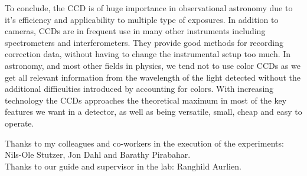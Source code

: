 \documentclass{emulateapj}
\begin{document}
To conclude, the CCD is of huge importance in observational astronomy due to it's efficiency and applicability to multiple type of exposures. In addition to cameras, CCDs are in frequent use in many other instruments including spectrometers and interferometers. They provide good methods for recording correction data, without having to change the instrumental setup too much. In astronomy, and most other fields in physics, we tend not to use color CCDs as we get all relevant information from the wavelength of the light detected without the additional difficulties introduced by accounting for colors. With increasing technology the CCDs approaches the theoretical maximum in most of the key features we want in a detector, as well as being versatile, small, cheap and easy to operate.

\begin{acknowledgements}
  Thanks to my colleagues and co-workers in the execution of the experiments: Nils-Ole Stutzer, Jon Dahl and Barathy Pirabahar.\\
Thanks to our guide and supervisor in the lab: Ranghild Aurlien.
\end{acknowledgements}
\pagebreak


\clearpage
\end{document}
